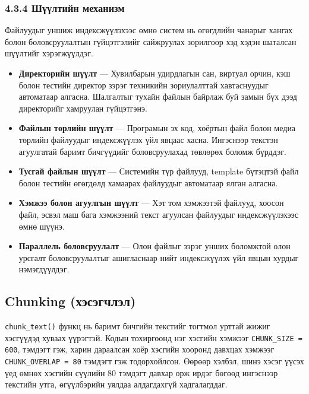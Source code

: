 \documentclass[11pt,a4paper]{article}
\begin{document}
\subsubsection*{4.3.4 Шүүлтийн механизм}

Файлуудыг уншиж индексжүүлэхээс өмнө систем нь өгөгдлийн чанарыг хангах болон боловсруулалтын гүйцэтгэлийг сайжруулах зорилгоор хэд хэдэн шаталсан шүүлтийг хэрэгжүүлдэг.

\begin{itemize}
    \item \textbf{Директорийн шүүлт} --- Хувилбарын удирдлагын сан, виртуал орчин, кэш болон тестийн директор зэрэг техникийн зориулалттай хавтаснуудыг автоматаар алгасна. Шалгалтыг тухайн файлын байрлаж буй замын бүх дээд директорийг хамруулан гүйцэтгэнэ.
    
    \item \textbf{Файлын төрлийн шүүлт} --- Програмын эх код, хоёртын файл болон медиа төрлийн файлуудыг индексжүүлэх үйл явцаас хасна. Ингэснээр текстэн агуулгатай баримт бичгүүдийг боловсруулахад төвлөрөх боломж бүрддэг.
    
    \item \textbf{Тусгай файлын шүүлт} --- Системийн түр файлууд, template бүтэцтэй файл болон тестийн өгөгдөлд хамаарах файлуудыг автоматаар ялган алгасна.
    
    \item \textbf{Хэмжээ болон агуулгын шүүлт} --- Хэт том хэмжээтэй файлууд, хоосон файл, эсвэл маш бага хэмжээний текст агуулсан файлуудыг индексжүүлэхээс өмнө шүүнэ.
    
    \item \textbf{Параллель боловсруулалт} --- Олон файлыг зэрэг унших боломжтой олон урсгалт боловсруулалтыг ашигласнаар нийт индексжүүлэх үйл явцын хурдыг нэмэгдүүлдэг.
\end{itemize}

\subsection{Chunking (хэсэгчлэл)}

\texttt{chunk\_text()} функц нь баримт бичгийн текстийг тогтмол урттай жижиг хэсгүүдэд хуваах үүрэгтэй. Кодын тохиргоонд нэг хэсгийн хэмжээг \texttt{CHUNK\_SIZE = 600}, тэмдэгт гэж, харин дараалсан хоёр хэсгийн хооронд давхцах хэмжээг \texttt{CHUNK\_OVERLAP = 80} тэмдэгт гэж тодорхойлсон. Өөрөөр хэлбэл, шинэ хэсэг үүсэх үед өмнөх хэсгийн сүүлийн 80 тэмдэгт давхар орж ирдэг бөгөөд ингэснээр текстийн утга, өгүүлбэрийн уялдаа алдагдахгүй хадгалагддаг.
\end{document}

